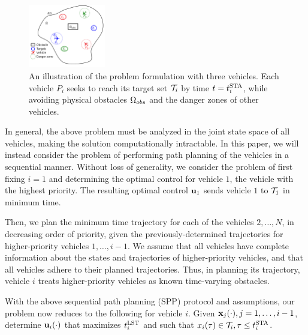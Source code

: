 \documentclass[letterpaper, 10pt, conference]{ieeeconf}      %
\begin{document}
\begin{figure}
	\centering
	\includegraphics[width=0.3\textwidth]{"formulation"}
	\caption{An illustration of the problem formulation with three vehicles. Each vehicle $P_i$ seeks to reach its target set $\mathcal{T}_i$ by time $t=t^{\text{STA}}_i$, while avoiding physical obstacles $\Omega_{obs}$ and the danger zones of other vehicles.}
	\label{fig:formulation}
\end{figure}

In general, the above problem must be analyzed in the joint state space of all vehicles, making the solution computationally intractable. In this paper, we will instead consider the problem of performing path planning of the vehicles in a sequential manner. Without loss of generality, we consider the problem of first fixing $i=1$ and determining the optimal control for vehicle $1$, the vehicle with the highest priority. The resulting optimal control $\mathbf{u}_1$ sends vehicle $1$ to $\mathcal{T}_1$ in minimum time. 

Then, we plan the minimum time trajectory for each of the vehicles $2,\ldots,N$, in decreasing order of priority, given the previously-determined trajectories for higher-priority vehicles $1,\ldots,i-1$. We assume that all vehicles have complete information about the states and trajectories of higher-priority vehicles, and that all vehicles adhere to their planned trajectories. Thus, in planning its trajectory, vehicle $i$ treats higher-priority vehicles as known time-varying obstacles. 

With the above sequential path planning (SPP) protocol and assumptions, our problem now reduces to the following for vehicle $i$. Given $\mathbf{x}_j(\cdot), j=1,\ldots,i-1$, determine $\mathbf{u}_i(\cdot)$ that maximizes $t^{\text{LST}}_i$ and such that $x_i(\tau) \in \mathcal{T}_i, \tau\le t^{\text{STA}}_i$.

% 
\end{document}
